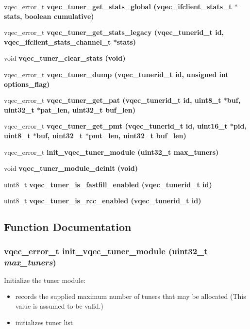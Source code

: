 \begin{CompactItemize}
\item 
vqec\_\-error\_\-t \bf{vqec\_\-tuner\_\-get\_\-stats\_\-global} (\bf{vqec\_\-ifclient\_\-stats\_\-t} $\ast$stats, boolean cumulative)
\item 
vqec\_\-error\_\-t \bf{vqec\_\-tuner\_\-get\_\-stats\_\-legacy} (vqec\_\-tunerid\_\-t id, \bf{vqec\_\-ifclient\_\-stats\_\-channel\_\-t} $\ast$stats)
\item 
void \bf{vqec\_\-tuner\_\-clear\_\-stats} (void)
\item 
vqec\_\-error\_\-t \bf{vqec\_\-tuner\_\-dump} (vqec\_\-tunerid\_\-t id, unsigned int options\_\-flag)
\item 
vqec\_\-error\_\-t \bf{vqec\_\-tuner\_\-get\_\-pat} (vqec\_\-tunerid\_\-t id, uint8\_\-t $\ast$buf, uint32\_\-t $\ast$pat\_\-len, uint32\_\-t buf\_\-len)
\item 
vqec\_\-error\_\-t \bf{vqec\_\-tuner\_\-get\_\-pmt} (vqec\_\-tunerid\_\-t id, uint16\_\-t $\ast$pid, uint8\_\-t $\ast$buf, uint32\_\-t $\ast$pmt\_\-len, uint32\_\-t buf\_\-len)
\item 
vqec\_\-error\_\-t \bf{init\_\-vqec\_\-tuner\_\-module} (uint32\_\-t max\_\-tuners)
\item 
void \bf{vqec\_\-tuner\_\-module\_\-deinit} (void)
\item 
uint8\_\-t \bf{vqec\_\-tuner\_\-is\_\-fastfill\_\-enabled} (vqec\_\-tunerid\_\-t id)
\item 
uint8\_\-t \bf{vqec\_\-tuner\_\-is\_\-rcc\_\-enabled} (vqec\_\-tunerid\_\-t id)
\end{CompactItemize}


\subsection{Function Documentation}
\subsubsection{\setlength{\rightskip}{0pt plus 5cm}vqec\_\-error\_\-t init\_\-vqec\_\-tuner\_\-module (uint32\_\-t {\em max\_\-tuners})}\label{vqec__tuner_8h_5fa468ebc64ffaa41e00bf12914944ac}


Initialize the tuner module:\begin{itemize}
\item records the supplied maximum number of tuners that may be allocated (This value is assumed to be valid.)\item initializes tuner list\end{itemize}


